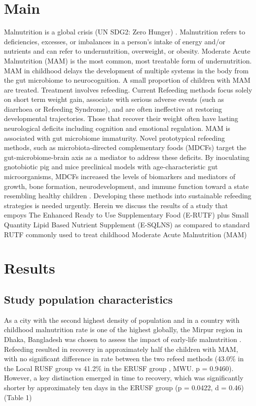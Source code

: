 \documentclass{article}
\begin{document}
\section*{Main}
Malnutrition is a global crisis (UN SDG2: Zero Hunger) \cite{UN_SDG2}.
Malnutrition refers to deficiencies, excesses, or imbalances in a person’s intake of energy and/or nutrients and can refer to undernutrition, overweight, or obesity.
Moderate Acute Malnutrition (MAM) is the most common, most treatable form of undernutrition.
MAM in childhood delays the development of multiple systems in the body from the gut microbiome to neurocognition.
A small proportion of children with MAM are treated.
Treatment involves refeeding.
Current Refeeding methods focus solely on short term weight gain, associate with serious adverse events (such as diarrhoea or Refeeding Syndrome), and are often ineffective at restoring developmental trajectories.
Those that recover their weight often have lasting neurological deficits including cognition and emotional regulation.
MAM is associated with gut microbiome immaturity.
Novel prototypical refeeding methods, such as microbiota-directed complementary foods (MDCFs) target the gut-microbiome-brain axis as a mediator to address these deficits.
By inoculating gnotobiotic pig and mice preclinical models with age-characteristic gut microorganisms, MDCFs increased the levels of biomarkers and mediators of growth, bone formation, neurodevelopment, and immune function toward a state resembling healthy children \cite{gehrig2019effects}.
Developing these methods into sustainable refeeding strategies is needed urgently.
Herein we discuss the results of a study that empoys The Enhanced Ready to Use Supplementary Food (E-RUTF) plus Small Quantity Lipid Based Nutrient Supplement (E-SQLNS) as compared to standard RUTF commonly used to treat childhood Moderate Acute Malnutrition (MAM) 

\section*{Results}
\subsection*{Study population characteristics}
As a city with the second highest density of population and in a country with childhood malnutrition rate is one of the highest globally, the Mirpur region in Dhaka, Bangladesh was chosen to assess the impact of early-life malnutrition \cite{ahmed2012nutrition}.
Refeeding resulted in recovery in approximately half the children with MAM, with no significant difference in rate between the two refeed methods (43.0\% in the Local RUSF group vs 41.2\% in the ERUSF group , MWU. p = 0.9460).
However, a key distinction emerged in time to recovery, which was significantly shorter by approximately ten days in the ERUSF group (p = 0.0422, d = 0.46) (Table 1)
\end{document}
